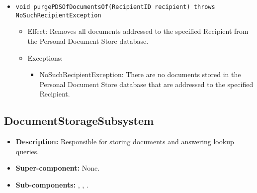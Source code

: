 \begin{itemize}
\begin{itemize}
		\item \texttt{void purgePDSOfDocumentsOf(RecipientID recipient) throws NoSuchRecipientException}
		\begin{itemize}
			\item Effect: Removes all documents addressed to the specified Recipient from the Personal Document Store database.
			\item Exceptions:
			\begin{itemize}
				\item NoSuchRecipientException: There are no documents stored in the Personal Document Store database that are addressed to the specified Recipient.
			\end{itemize}
		\end{itemize}
	\end{itemize}
\end{itemize}

\subsection{DocumentStorageSubsystem}
\begin{itemize}
	\item \textbf{Description:} Responsible for storing documents and answering lookup queries.
	\item \textbf{Super-component:} None.
	\item \textbf{Sub-components:} , , .
\end{itemize}

